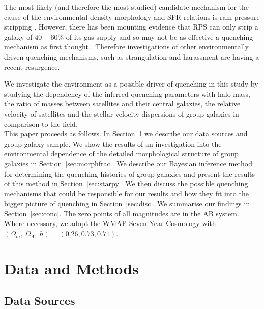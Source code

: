 \documentclass[useAMS,usenatbib]{mn2e}
\begin{document}
The most likely (and therefore the most studied) candidate mechanism for the cause of the environmental density-morphology and SFR relations is ram pressure stripping \citep[RPS;][]{abadi99, poggianti99}. However, there has been mounting evidence that RPS can only strip a galaxy of $40-60\%$ of its gas supply \citep{fillingham16} and so may not be as effective a quenching mechanism as first thought \citep{emerick16}. Therefore investigations of other environmentally driven quenching mechanisms, such as strangulation \citep{peng15, hahn16, maier16, paccagnella16, roberts16, vandevoort16} and harassment \citep[high speed galaxy `fly-by' gravitational interactions][]{bialas15, smith15b} are having a recent resurgence. 


We investigate the environment as a possible driver of quenching in this study by studying the dependency of the inferred quenching parameters with halo mass, the ratio of masses between satellites and their central galaxies, the relative velocity of satellites and the stellar velocity dispersions of group galaxies in comparison to the field. 
\\

This paper proceeds as follows. In Section~\ref{sec:data} we describe our data sources and group galaxy sample. We show the results of an investigation into the environmental dependence of the detailed morphological structure of group galaxies in Section~\ref{sec:morphfrac}. We describe our Bayesian inference method for determining the quenching histories of group galaxies and present the results of this method in Section~\ref{sec:starpy}. We then discuss the possible quenching mechanisms that could be responsible for our results and how they fit into the bigger picture of quenching in Section~\ref{sec:disc}. We summarise our findings in Section~\ref{sec:conc}. The zero points of all magnitudes are in the AB system. Where necessary, we adopt the WMAP Seven-Year Cosmology \citep{jarosik11} with $(\Omega_m , ~\Omega_\Lambda , ~h) = (0.26, 0.73, 0.71)$.

 
\section{Data and Methods}\label{sec:data}

\subsection{Data Sources}\label{sec:photo}
\end{document}
